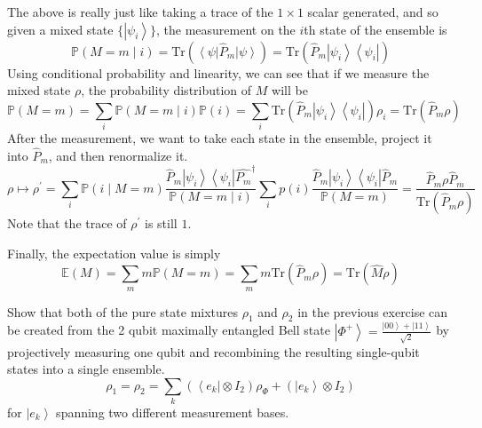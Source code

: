 \documentclass{article}
\newcommand{\ket}[1]{\ensuremath{\left|#1\right\rangle}}
\newcommand{\bra}[1]{\ensuremath{\left\langle#1\right|}}
\begin{document}
    \begin{lemma}
      The above is really just like taking a trace of the $1 \times 1$ scalar generated, and so given a mixed state $\{ \ket{\psi_i}\}$, the measurement on the $i$th state of the ensemble is 
      \begin{equation}
        \mathbb{P}(M = m \mid i) = \mathrm{Tr}(\bra{\psi} \hat{P}_m \ket{\psi}) = \mathrm{Tr}( \hat{P}_m \ket{\psi_i} \bra{\psi_i}) 
      \end{equation}
      Using conditional probability and linearity, we can see that if we measure the mixed state $\rho$, the probability distribution of $M$ will be 
      \begin{equation}
        \mathbb{P}(M = m) = \sum_i \mathbb{P}(M = m \mid i) \mathbb{P}(i) = \sum_i \mathrm{Tr}(\hat{P}_m \ket{\psi_i} \bra{\psi_i}) \rho_i = \mathrm{Tr}(\hat{P}_m \rho) 
      \end{equation}
      After the measurement, we want to take each state in the ensemble, project it into $\hat{P}_m$, and then renormalize it. 
      \begin{equation}
        \rho \mapsto \rho^\prime = \sum_i \mathbb{P}(i \mid M = m) \frac{\hat{P}_m \ket{\psi_i} \bra{\psi_i} \hat{P_m}^\dagger}{\mathbb{P}(M = m \mid i)} \sum_i p(i) \frac{\hat{P}_m \ket{\psi_i} \bra{\psi_i} \hat{P}_m}{\mathbb{P}(M = m)} = \frac{\hat{P}_m \rho \hat{P}_m}{\mathrm{Tr}(\hat{P}_m \rho)} 
      \end{equation}
      Note that the trace of $\rho^\prime$ is still $1$. 
    \end{lemma}

    \begin{lemma}
      Finally, the expectation value is simply 
      \begin{equation}
        \mathbb{E}(M) = \sum_m m \mathbb{P}(M = m) = \sum_m m \mathrm{Tr}(\hat{P}_m \rho) = \mathrm{Tr}(\hat{M} \rho)
      \end{equation}
    \end{lemma}

    \begin{exercise}
      Show that both of the pure state mixtures $\rho_1$ and $\rho_2$ in the previous exercise can be created from the 2 qubit maximally entangled Bell state $\ket{\Phi^+} = \frac{\ket{00} + \ket{11}}{\sqrt{2}}$ by projectively measuring one qubit and recombining the resulting single-qubit states into a single ensemble. 
      \begin{equation}
        \rho_1 = \rho_2 = \sum_k ( \bra{e_k} \otimes I_2) \rho_{\Phi} + (\ket{e_k} \otimes I_2)
      \end{equation}
      for $\ket{e_k}$ spanning two different measurement bases. 
    \end{exercise}
\end{document}
